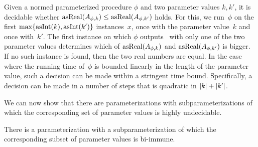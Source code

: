 Given a normed parameterized procedure $\phi$ and two parameter values $k, k'$, it is decidable whether $\operatorname{asReal}(A_{\phi, k}) \le \operatorname{asReal}(A_{\phi, k'})$ holds.
For this, we run~$\phi$ on the first $\max \{\operatorname{asInt}(k), \operatorname{asInt}(k')\}$ instances~$x$, once with the parameter value~$k$ and once with~$k'$.
The first instance on which $\phi$ outputs~ with only one of the two parameter values determines which of $\operatorname{asReal}(A_{\phi, k})$ and $\operatorname{asReal}(A_{\phi, k'})$ is bigger.
If no such instance is found, then the two real numbers are equal.
In the case where the running time of~$\phi$ is bounded linearly in the length of the parameter value, such a decision can be made within a stringent time bound.
Specifically, a decision can be made in a number of steps that is quadratic in ${\lvert k\rvert} + {\lvert k'\rvert}$.

We can now show that there are parameterizations with subparameterizations of which the corresponding set of parameter values is highly undecidable.
\begin{lemma}
\label{lem:subparameterization_bi-immune}%
  There is a parameterization with a subparameterization of which the corresponding subset of parameter values is bi-immune.
\end{lemma}
